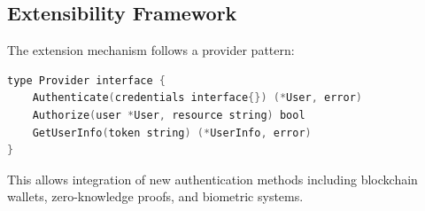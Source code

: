 \subsection{Extensibility Framework}

The extension mechanism follows a provider pattern:

\begin{lstlisting}[language=C]
type Provider interface {
    Authenticate(credentials interface{}) (*User, error)
    Authorize(user *User, resource string) bool
    GetUserInfo(token string) (*UserInfo, error)
}
\end{lstlisting}

This allows integration of new authentication methods including blockchain wallets, zero-knowledge proofs, and biometric systems.

